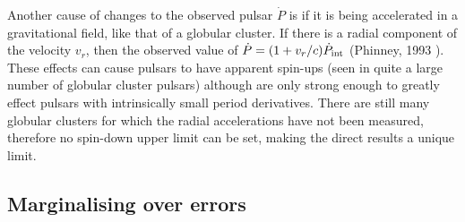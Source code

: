 Another cause of changes to the observed pulsar $\dot{P}$ is if it is being accelerated in a
gravitational field, like that of a globular cluster. If there is a radial component of the
velocity $v_r$, then the observed value of $\dot{P}=(1+v_r/c)\dot{P}_{\rm int}$ (Phinney, 1993
\cite{Phinney:1993}). These effects can cause pulsars to have apparent spin-ups (seen in quite a
large number of globular cluster pulsars) although are only strong enough to greatly effect pulsars
with intrinsically small period derivatives. There are still many globular clusters for which the
radial accelerations have not been measured, therefore no spin-down upper limit can be set, making
the direct \gw results a unique limit.

\subsection{Marginalising over errors}\label{MargErrs}

